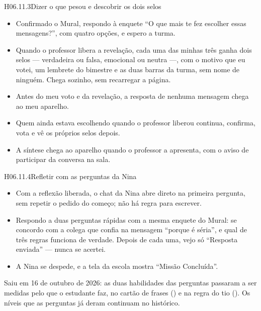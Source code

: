 \begin{historia}{H06.11.3}{Dizer o que pesou e descobrir os dois selos}{\pronto}
\aceite
\begin{itemize}
  \item Confirmado o Mural, respondo à enquete \enquote{O que mais te fez
    escolher essas mensagens?}, com quatro opções, e espero a turma.
  \item Quando o professor libera a revelação, cada uma das minhas três ganha
    dois selos --- verdadeira ou falsa, emocional ou neutra ---, com o motivo
    que eu votei, um lembrete do bimestre e as duas barras da turma, sem nome
    de ninguém. Chega sozinho, sem recarregar a página.
  \item Antes do meu voto e da revelação, a resposta de nenhuma mensagem chega
    ao meu aparelho.
  \item Quem ainda estava escolhendo quando o professor liberou continua,
    confirma, vota e vê os próprios selos depois.
  \item A síntese chega ao aparelho quando o professor a apresenta, com o aviso
    de participar da conversa na sala.
\end{itemize}
\end{historia}

\begin{historia}{H06.11.4}{Refletir com as perguntas da Nina}{\arquivada}
\aceite
\begin{itemize}
  \item Com a reflexão liberada, o chat da Nina abre direto na primeira
    pergunta, sem repetir o pedido do começo; não há regra para escrever.
  \item Respondo a duas perguntas rápidas com a mesma enquete do Mural: se
    concordo com a colega que confia na mensagem \enquote{porque é séria}, e
    qual de três regras funciona de verdade. Depois de cada uma, vejo só
    \enquote{Resposta enviada} --- nunca se acertei.
  \item A Nina se despede, e a tela da escola mostra \enquote{Missão
    Concluída}.
\end{itemize}
Saiu em 16 de outubro de 2026: as duas habilidades das perguntas passaram a ser
medidas pelo que o estudante faz, no cartão de frases () e na
regra do tio (). Os níveis que as perguntas já deram continuam no
histórico.
\end{historia}

